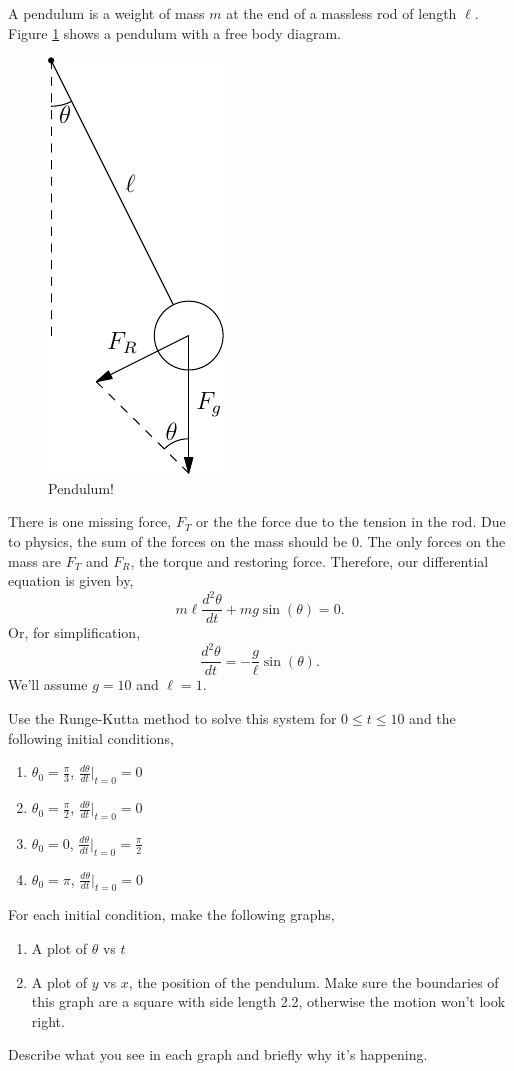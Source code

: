 \documentclass[11pt,letterpaper]{article}
\begin{document}
\begin{problem}
 A pendulum is a weight of mass $m$ at the end of a massless rod of length $\ell$. Figure 
\ref{fig:pendulum} shows a pendulum with a free body diagram. 
\begin{figure}[!ht]
 \centering
 \includegraphics{images/pendulum.pdf}
 \caption{Pendulum!}
 \label{fig:pendulum}
\end{figure}
There is one missing force, $F_T$ or the the force due to the tension in the rod. Due to physics,
the sum of the forces on the mass should be 0. The only forces on the mass are $F_T$ and $F_R$,
the torque and restoring force. Therefore, our differential equation is given by,
\[
 m\ell\frac{d^2\theta}{dt} + mg\sin(\theta) = 0.
\]
Or, for simplification,
\[
 \frac{d^2\theta}{dt} = -\frac{g}{\ell}\sin(\theta).
\]
We'll assume $g=10$ and $\ell=1$.

Use the Runge-Kutta method to solve this system for $0\le t\le 10$ and the following initial conditions,
\begin{enumerate}
 \item $\theta_0 = \frac{\pi}{3}$, $\frac{d\theta}{dt}|_{t=0} = 0$
 \item $\theta_0 = \frac{\pi}{2}$, $\frac{d\theta}{dt}|_{t=0} = 0$
 \item $\theta_0 = 0$, $\frac{d\theta}{dt}|_{t=0} = \frac{\pi}{2}$
 \item $\theta_0 = \pi$, $\frac{d\theta}{dt}|_{t=0} = 0$
\end{enumerate}
For each initial condition, make the following graphs,
\begin{enumerate}
 \item A plot of $\theta$ vs $t$
 \item A plot of $y$ vs $x$, the position of the pendulum. Make sure the boundaries of this graph
are a square with side length 2.2, otherwise the motion won't look right.
\end{enumerate}

Describe what you see in each graph and briefly why it's happening.

\end{problem}






\end{document}
